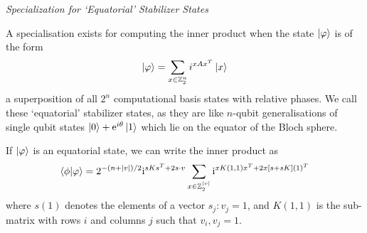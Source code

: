 \large{\itshape{Specialization for `Equatorial' Stabilizer States}}\par
A specialisation exists for computing the inner product when the state $\ket{\varphi}$ is of the form
\[\ket{\varphi} = \sum_{x\in\mathbb{Z}_{2}^{n}}i^{xAx^{T}}\ket{x}\]
a superposition of all $2^{n}$ computational basis states with relative phases. We call these `equatorial' stabilizer states, as they are like $n$-qubit generalisations of single qubit states $\ket{0}+\mathrm{e}^{i\theta}\ket{1}$ which lie on the equator of the Bloch sphere.
\begin{cla}
If $\ket{\varphi}$ is an equatorial state, we can write the inner product as
\begin{equation}
\braket{\phi}{\varphi} = 2^{-(n+\vert v\vert)/2}\mathrm{i}^{sKs^{T}+2s\cdot v}\sum_{x\in\mathbb{Z}_{2}^{\vert v\vert}}\mathrm{i}^{xK(1,1)x^{T}+2x[s+sK](1)^{T}}
\end{equation}\label{claim:exp_sum_ip}
where $s(1)$ denotes the elements of a vector $s_{j}: v_{j}=1$, and $K(1,1)$ is the sub-matrix with rows $i$ and columns $j$ such that $v_{i},v_{j}=1$. 
\end{cla}
